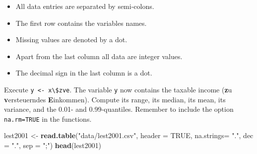 \documentclass[]{article}
\newenvironment{Shaded}{\begin{snugshade}}{\end{snugshade}}
\newcommand{\KeywordTok}[1]{\textcolor[rgb]{0.13,0.29,0.53}{\textbf{#1}}}
\newcommand{\DataTypeTok}[1]{\textcolor[rgb]{0.13,0.29,0.53}{#1}}
\newcommand{\StringTok}[1]{\textcolor[rgb]{0.31,0.60,0.02}{#1}}
\newcommand{\OtherTok}[1]{\textcolor[rgb]{0.56,0.35,0.01}{#1}}
\newcommand{\NormalTok}[1]{#1}
\providecommand{\tightlist}{%
  \setlength{\itemsep}{0pt}\setlength{\parskip}{0pt}}
\begin{document}
\begin{itemize}
\tightlist
\item
  All data entries are separated by semi-colons.
\item
  The first row contains the variables names.
\item
  Missing values are denoted by a dot.
\item
  Apart from the last column all data are integer values.
\item
  The decimal sign in the last column is a dot.
\end{itemize}

Execute \texttt{y\ \textless{}-\ x\textbackslash{}\$zve}. The variable
\texttt{y} now contains the taxable income (\textbf{z}u
\textbf{v}ersteuerndes \textbf{E}inkommen). Compute its range, its
median, its mean, its variance, and the 0.01- and 0.99-quantiles.
Remember to include the option \texttt{na.rm=TRUE} in the functions.

\begin{Shaded}
\begin{Highlighting}[]
\NormalTok{lest2001 <-}\StringTok{ }\KeywordTok{read.table}\NormalTok{(}\StringTok{"data/lest2001.csv"}\NormalTok{, }\DataTypeTok{header =} \OtherTok{TRUE}\NormalTok{, }\DataTypeTok{na.strings=} \StringTok{"."}\NormalTok{, }\DataTypeTok{dec =} \StringTok{"."}\NormalTok{, }\DataTypeTok{sep =} \StringTok{";"}\NormalTok{)}
\KeywordTok{head}\NormalTok{(lest2001)}
\end{Highlighting}
\end{Shaded}
\end{document}
